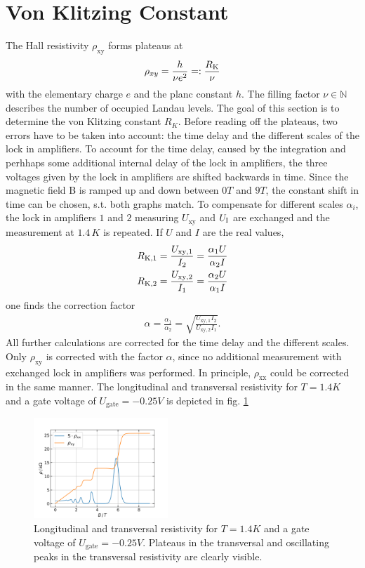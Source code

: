 \section{Von Klitzing Constant}

The Hall resistivity $\rho_{\text{xy}}$ forms plateaus at
\begin{align}
    \rho_{xy} = \frac{h}{\nu e^2} =: \frac{R_\text K}{\nu}
\end{align}
with the elementary charge $e$ and the planc constant $h$. 
The filling factor $\nu \in \mathbb N$ describes the number of occupied Landau levels.
The goal of this section is to determine the von Klitzing constant $R_K$.
Before reading off the plateaus, two errors have to be taken into account:
the time delay and the different scales of the lock in amplifiers.
To account for the time delay, 
caused by the integration and perhhaps some additional internal delay of the lock in amplifiers,
the three voltages given by the lock in amplifiers are shifted backwards in time.
Since the magnetic field B is ramped up and down between $0T$ and $9T$, 
the constant shift in time can be chosen, s.t. both graphs match.
To compensate for different scales $\alpha_i$, 
the lock in amplifiers $1$ and $2$ measuring $U_\text{xy}$ and $U_\text I$ are exchanged and the measurement at $1.4\,K$ is repeated.
If $U$ and $I$ are the real values,
\begin{align}
    R_{\text K,1} = \frac{U_{\text{xy}, 1}}{I_2} = \frac{\alpha_1 U}{\alpha_2 I}\\
    R_{\text K,2} = \frac{U_{\text{xy}, 2}}{I_1} = \frac{\alpha_2 U}{\alpha_1 I}
\end{align}
one finds the correction factor
\begin{align}
    \alpha = \frac{\alpha_1}{\alpha_2} = \sqrt{\frac{U_{\text{xy},1}I_2}{U_{\text{xy}, 2}I_1}}. 
\end{align}
All further calculations are corrected for the time delay and the different scales.
Only $\rho_{\text{xy}}$ is corrected with the factor $\alpha$, 
since no additional measurement with exchanged lock in amplifiers was performed.
In principle, $\rho_{\text{xx}}$ could be corrected in the same manner.
The longitudinal and transversal resistivity for $T=1.4K$ and a gate voltage of $U_\text{gate}=-0.25V$ is depicted in fig. \ref{fig:KlitzingBeispielBild}
\begin{figure}[h]
    \centering
    \includegraphics[width=0.45\textwidth]{../Images/BeispielBildVomAnfang.png}
    \caption{
        Longitudinal and transversal resistivity for $T=1.4K$ and a gate voltage of $U_\text{gate}=-0.25V$.
        Plateaus in the transversal and oscillating peaks in the transversal resistivity are clearly visible.
        }
    \label{fig:KlitzingBeispielBild}
\end{figure}
